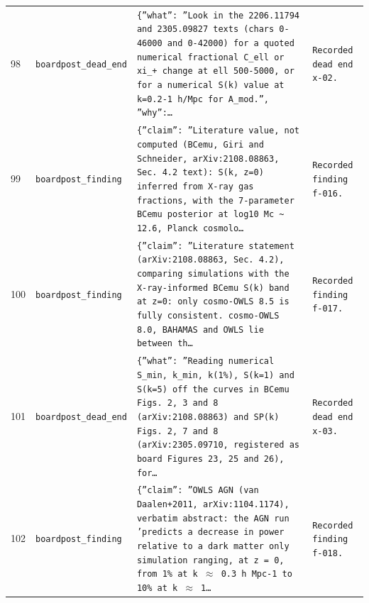 \documentclass[11pt,a4paper]{article}
\begin{document}
\begin{longtable}{@{}p{}p{}p{}p{}@{}}
98 & \texttt{board}\newline\texttt{post\_\allowbreak{}dead\_\allowbreak{}end} & \texttt{\{''what'':\allowbreak{} ''Look in the 2206.11794 and 2305.09827 texts (chars 0-46000 and 0-42000)\allowbreak{} for a quoted numerical fractional C\_\allowbreak{}ell or xi\_\allowbreak{}+ change at ell 500-5000,\allowbreak{} or for a numerical S(k)\allowbreak{} value at k=\allowbreak{}0.2-1 h/\allowbreak{}Mpc for A\_\allowbreak{}mod.'',\allowbreak{} ''why'':\allowbreak{}\ldots{}\allowbreak{}} & \texttt{Recorded dead end x-02.} \\
99 & \texttt{board}\newline\texttt{post\_\allowbreak{}finding} & \texttt{\{''claim'':\allowbreak{} ''Literature value,\allowbreak{} not computed (BCemu,\allowbreak{} Giri and Schneider,\allowbreak{} arXiv:\allowbreak{}2108.08863,\allowbreak{} Sec. 4.2 text)\allowbreak{}:\allowbreak{} S(k,\allowbreak{} z=\allowbreak{}0)\allowbreak{} inferred from X-ray gas fractions,\allowbreak{} with the 7-parameter BCemu posterior at log10 Mc \textasciitilde{}\allowbreak{} 12.6,\allowbreak{} Planck cosmolo\ldots{}\allowbreak{}} & \texttt{Recorded finding f-016.} \\
100 & \texttt{board}\newline\texttt{post\_\allowbreak{}finding} & \texttt{\{''claim'':\allowbreak{} ''Literature statement (arXiv:\allowbreak{}2108.08863,\allowbreak{} Sec. 4.2)\allowbreak{},\allowbreak{} comparing simulations with the X-ray-informed BCemu S(k)\allowbreak{} band at z=\allowbreak{}0:\allowbreak{} only cosmo-OWLS 8.5 is fully consistent. cosmo-OWLS 8.0,\allowbreak{} BAHAMAS and OWLS lie between th\ldots{}\allowbreak{}} & \texttt{Recorded finding f-017.} \\
101 & \texttt{board}\newline\texttt{post\_\allowbreak{}dead\_\allowbreak{}end} & \texttt{\{''what'':\allowbreak{} ''Reading numerical S\_\allowbreak{}min,\allowbreak{} k\_\allowbreak{}min,\allowbreak{} k(1\%)\allowbreak{},\allowbreak{} S(k=\allowbreak{}1)\allowbreak{} and S(k=\allowbreak{}5)\allowbreak{} off the curves in BCemu Figs. 2,\allowbreak{} 3 and 8 (arXiv:\allowbreak{}2108.08863)\allowbreak{} and SP(k)\allowbreak{} Figs. 2,\allowbreak{} 7 and 8 (arXiv:\allowbreak{}2305.09710,\allowbreak{} registered as board Figures 23,\allowbreak{} 25 and 26)\allowbreak{},\allowbreak{} for\ldots{}\allowbreak{}} & \texttt{Recorded dead end x-03.} \\
102 & \texttt{board}\newline\texttt{post\_\allowbreak{}finding} & \texttt{\{''claim'':\allowbreak{} ''OWLS AGN (van Daalen+2011,\allowbreak{} arXiv:\allowbreak{}1104.1174)\allowbreak{},\allowbreak{} verbatim abstract:\allowbreak{} the AGN run 'predicts a decrease in power relative to a dark matter only simulation ranging,\allowbreak{} at z =\allowbreak{} 0,\allowbreak{} from 1\% at k $\approx$ 0.3 h Mpc-1 to 10\% at k $\approx$ 1\ldots{}\allowbreak{}} & \texttt{Recorded finding f-018.} \\

\end{longtable}
\end{document}
